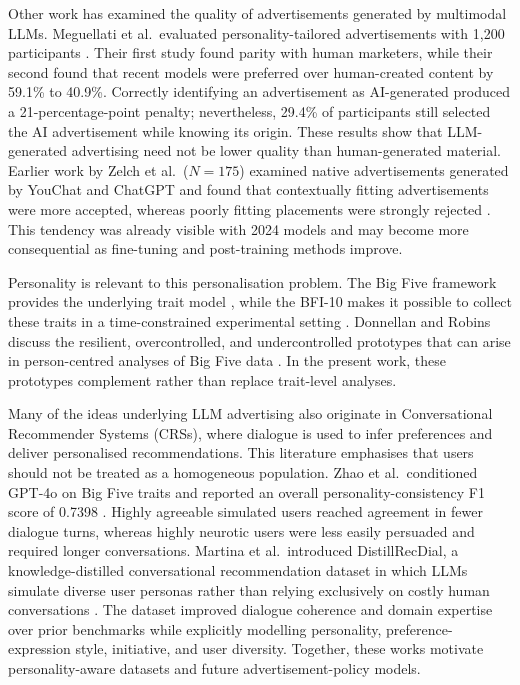\documentclass[english]{article}
\begin{document}
Other work has examined the quality of advertisements generated by multimodal LLMs.
Meguellati et al.\ evaluated personality-tailored advertisements with 1,200
participants \cite{meguellati2025llmads}. Their first study found parity with human
marketers, while their second found that recent models were preferred over
human-created content by 59.1\% to 40.9\%. Correctly identifying an advertisement as
AI-generated produced a 21-percentage-point penalty; nevertheless, 29.4\% of
participants still selected the AI advertisement while knowing its origin. These
results show that LLM-generated advertising need not be lower quality than
human-generated material. Earlier work by Zelch et al.\ ($N=175$) examined native
advertisements generated by YouChat and ChatGPT and found that contextually fitting
advertisements were more accepted, whereas poorly fitting placements were strongly
rejected \cite{zelch2024acceptance}. This tendency was already visible with 2024
models and may become more consequential as fine-tuning and post-training methods
improve.

Personality is relevant to this personalisation problem. The Big Five framework
provides the underlying trait model \cite{john1999bigfive}, while the BFI-10 makes
it possible to collect these traits in a time-constrained experimental setting
\cite{rammstedt2007bfi10}. Donnellan and Robins discuss the resilient,
overcontrolled, and undercontrolled prototypes that can arise in person-centred
analyses of Big Five data \cite{donnellan2010types}. In the present work, these
prototypes complement rather than replace trait-level analyses.

Many of the ideas underlying LLM advertising also originate in Conversational
Recommender Systems (CRSs), where dialogue is used to infer preferences and deliver
personalised recommendations. This literature emphasises that users should not be
treated as a homogeneous population. Zhao et al.\ conditioned GPT-4o on Big Five
traits and reported an overall personality-consistency F1 score of 0.7398
\cite{zhao2025exploring}. Highly agreeable simulated users reached agreement in
fewer dialogue turns, whereas highly neurotic users were less easily persuaded and
required longer conversations. Martina et al.\ introduced DistillRecDial, a
knowledge-distilled conversational recommendation dataset in which LLMs simulate
diverse user personas rather than relying exclusively on costly human conversations
\cite{martina2025distillrecdial}. The dataset improved dialogue coherence and
domain expertise over prior benchmarks while explicitly modelling personality,
preference-expression style, initiative, and user diversity. Together, these works
motivate personality-aware datasets and future advertisement-policy models.
\end{document}
